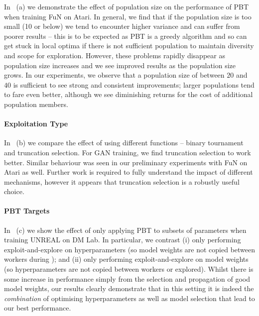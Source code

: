 In ~(a) we demonstrate the effect of population size on the performance of PBT when training FuN on Atari. In general, we find that if the population size is too small (10 or below) we tend to encounter higher variance and can suffer from poorer results -- this is to be expected as PBT is a greedy algorithm and so can get stuck in local optima if there is not sufficient population to maintain diversity and scope for exploration. However, these problems rapidly disappear as population size increases and we see improved results as the population size grows. In our experiments, we observe that a population size of between $20$ and $40$ is sufficient to see strong and consistent improvements; larger populations tend to fare even better, although we see diminishing returns for the cost of additional population members.


\paragraph{Exploitation Type}\label{sec:analysis_exploit}

In ~(b) we compare the effect of using different \pbtexploit functions -- binary tournament and truncation selection. For GAN training, we find truncation selection to work better. Similar behaviour was seen in our preliminary experiments with FuN on Atari as well.
Further work is required to fully understand the impact of different \pbtexploit mechanisms, however it appears that truncation selection is a robustly useful choice.


\paragraph{PBT Targets}\label{sec:analysis_pbt_targets}

In ~(c) we show the effect of only applying PBT to subsets of parameters when training UNREAL on DM Lab. In particular, we contrast (i) only performing exploit-and-explore on hyperparameters (so model weights are not copied between workers during \pbtexploit); and (ii) only performing exploit-and-explore on model weights (so hyperparameters are not copied between workers or explored). Whilst there is some increase in performance simply from the selection and propagation of good model weights, our results clearly demonstrate that in this setting it is indeed the \emph{combination} of optimising hyperparameters as well as model selection that lead to our best performance.

